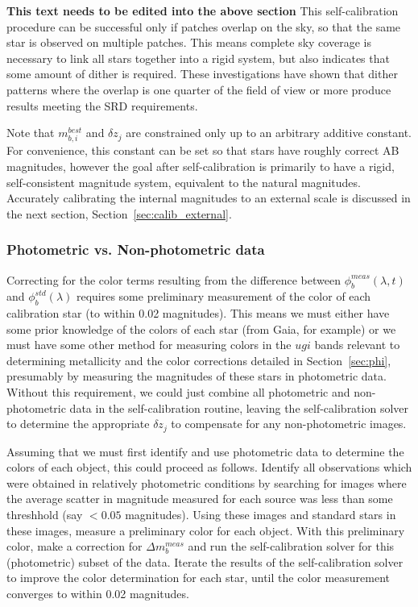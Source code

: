 \documentclass[12pt,preprint]{aastex}
\begin{document}
{\bf This text needs to be edited into the above section }
This self-calibration procedure can be successful only if patches
overlap on the sky, so that the same star is observed on 
multiple patches. This means complete sky coverage is necessary to
link all stars together into a rigid system, but also indicates that
some amount of dither is required. These investigations have shown
that dither patterns where the overlap is one quarter of the field of
view or more produce results meeting the SRD requirements. 

Note that $m_{b,i}^{best}$ and $\delta z_j$ are
constrained only up to an arbitrary additive constant. For
convenience, this constant can be set so that stars have roughly
correct AB magnitudes, however the goal after self-calibration is
primarily to have a rigid, self-consistent magnitude system,
equivalent to the natural magnitudes. Accurately calibrating the internal
magnitudes to an external scale is discussed in the next section, 
Section~\ref{sec:calib_external}. 

\subsubsection{Photometric vs. Non-photometric data}

Correcting for the color terms resulting from the difference between
$\phi_b^{meas}(\lambda,t)$ and $\phi_b^{std}(\lambda)$ requires some
preliminary measurement of the color of each calibration star (to
within 0.02 magnitudes).  This means we must either have some prior
knowledge of the colors of each star (from Gaia, for example) or we
must have some other method for measuring colors in the $ugi$ bands
relevant to determining metallicity and the color corrections detailed
in Section~\ref{sec:phi}, presumably by measuring the magnitudes of
these stars in photometric data.  Without
this requirement, we could just combine all photometric and
non-photometric data in the self-calibration routine, leaving the
self-calibration solver to determine the appropriate $\delta z_j$ to
compensate for any non-photometric images.

Assuming that we must first identify and use photometric data to
determine the colors of each object, this could proceed as follows. 
Identify all observations which were obtained in relatively
photometric conditions by searching for images where the average
scatter in magnitude measured for each source was less than some
threshhold (say $<0.05$ magnitudes). Using these images and standard
stars in these images, measure a preliminary color for each
object. With this preliminary color, make a correction for $\Delta
m_b^{meas}$ and run the self-calibration solver for this (photometric) subset of the
data. Iterate the results of the self-calibration solver to improve
the color determination for each star, until the color measurement
converges to within 0.02 magnitudes. 
\end{document}
